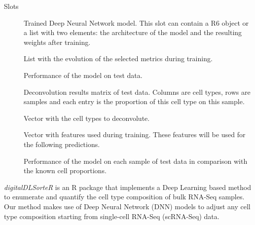 \documentclass[a4paper]{book}
\begin{document}
%
\begin{Section}{Slots}

\begin{description}

\item[] Trained Deep Neural Network model. This slot can contain a R6
 object or a list with two
elements: the architecture of the model and the resulting weights after
training.

\item[] List with the evolution of the selected metrics during
training.

\item[] Performance of the model on test data.

\item[] Deconvolution results matrix of test data. Columns are
cell types, rows are samples and each entry is the proportion of this cell
type on this sample.

\item[] Vector with the cell types to deconvolute.

\item[] Vector with features used during training. These features will
be used for the following predictions.

\item[] Performance of the model on each sample of test data
in comparison with the known cell proportions.

\end{description}
\end{Section}
%
\begin{Description}\relax
\emph{digitalDLSorteR} is an R package that implements a Deep Learning based
method to enumerate and quantify the cell type composition of bulk RNA-Seq
samples. Our method makes use of Deep Neural Network (DNN) models to adjust
any cell type composition starting from single-cell RNA-Seq (scRNA-Seq) data.
\end{Description}
%
\end{document}
